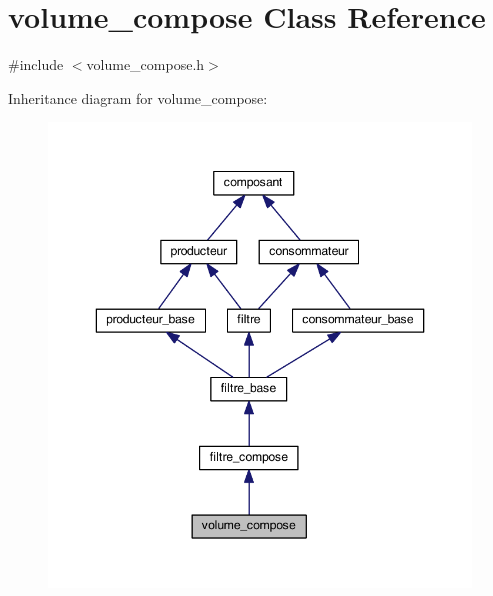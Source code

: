 \hypertarget{classvolume__compose}{\section{volume\-\_\-compose Class Reference}
\label{classvolume__compose}
}


{\ttfamily \#include $<$volume\-\_\-compose.\-h$>$}



Inheritance diagram for volume\-\_\-compose\-:
\nopagebreak
\begin{figure}[H]
\begin{center}
\leavevmode
\includegraphics[width=346pt]{classvolume__compose__inherit__graph}
\end{center}
\end{figure}


